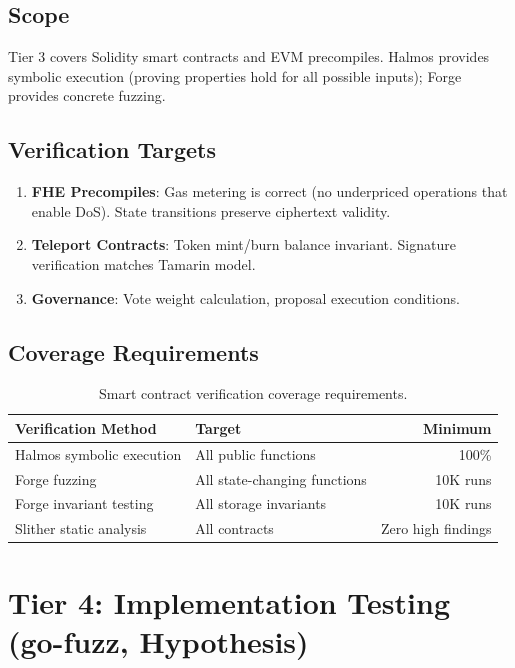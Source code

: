 \documentclass[11pt]{article}
\begin{document}
\subsection{Scope}

Tier 3 covers Solidity smart contracts and EVM precompiles. Halmos provides symbolic execution (proving properties hold for all possible inputs); Forge provides concrete fuzzing.

\subsection{Verification Targets}

\begin{enumerate}
\item \textbf{FHE Precompiles}: Gas metering is correct (no underpriced operations that enable DoS). State transitions preserve ciphertext validity.
\item \textbf{Teleport Contracts}: Token mint/burn balance invariant. Signature verification matches Tamarin model.
\item \textbf{Governance}: Vote weight calculation, proposal execution conditions.
\end{enumerate}

\subsection{Coverage Requirements}

\begin{table}[h]
\centering
\begin{tabular}{@{}llr@{}}
\toprule
\textbf{Verification Method} & \textbf{Target} & \textbf{Minimum} \\
\midrule
Halmos symbolic execution & All public functions & 100\% \\
Forge fuzzing & All state-changing functions & 10K runs \\
Forge invariant testing & All storage invariants & 10K runs \\
Slither static analysis & All contracts & Zero high findings \\
\bottomrule
\end{tabular}
\caption{Smart contract verification coverage requirements.}
\label{tab:coverage}
\end{table}

\section{Tier 4: Implementation Testing (go-fuzz, Hypothesis)}
\end{document}
